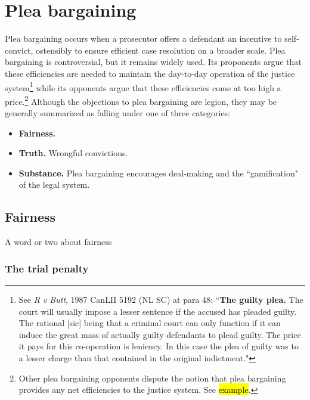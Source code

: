 \section{Plea bargaining}

Plea bargaining occurs when a prosecutor offers a defendant an incentive to self-convict, ostensibly to ensure efficient case resolution on a broader scale. Plea bargaining is controversial, but it remains widely used. Its proponents argue that these efficiencies are needed to maintain the day-to-day operation of the justice system\footnote{See \textit{R v Butt}, 1987 CanLII 5192 (NL SC) at para 48: ``\textbf{The guilty plea.} The court will usually impose a lesser sentence if the accused has pleaded guilty. The rational [sic] being that a criminal court can only function if it can induce the great mass of actually guilty defendants to plead guilty. The price it pays for this co-operation is leniency. In this case the plea of guilty was to a lesser charge than that contained in the original indictment."} while its opponents argue that these efficiencies come at too high a price.\footnote{Other plea bargaining opponents dispute the notion that plea bargaining provides any net efficiencies to the justice system. See \hl{example}.} Although the objections to plea bargaining are legion, they may be generally summarized as falling under one of three categories:

\begin{itemize}
    \item \textbf{Fairness.} 
    \item \textbf{Truth.} Wrongful convictions. 
    \item \textbf{Substance.} Plea bargaining encourages deal-making and the ``gamification" of the legal system. 
\end{itemize}



\subsection{Fairness}

A word or two about fairness

\subsubsection{The trial penalty}

